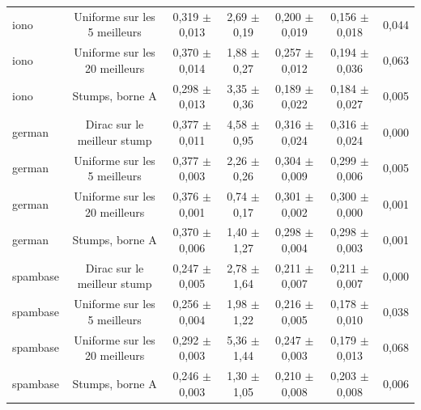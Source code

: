\begin{table}[tbp]
{\begin{tabular}{lcccccc}
iono & Uniforme sur les 5 meilleurs & 0,319 $\pm$ 0,013 & 2,69 $\pm$ 0,19 & 0,200 $\pm$ 0,019 & 0,156 $\pm$ 0,018 & 0,044 \\
iono & Uniforme sur les 20 meilleurs & 0,370 $\pm$ 0,014 & 1,88 $\pm$ 0,27 & 0,257 $\pm$ 0,012 & 0,194 $\pm$ 0,036 & 0,063 \\
iono & Stumps, borne A & 0,298 $\pm$ 0,013 & 3,35 $\pm$ 0,36 & 0,189 $\pm$ 0,022 & 0,184 $\pm$ 0,027 & 0,005 \\
german & Dirac sur le meilleur stump & 0,377 $\pm$ 0,011 & 4,58 $\pm$ 0,95 & 0,316 $\pm$ 0,024 & 0,316 $\pm$ 0,024 & 0,000 \\
german & Uniforme sur les 5 meilleurs & 0,377 $\pm$ 0,003 & 2,26 $\pm$ 0,26 & 0,304 $\pm$ 0,009 & 0,299 $\pm$ 0,006 & 0,005 \\
german & Uniforme sur les 20 meilleurs & 0,376 $\pm$ 0,001 & 0,74 $\pm$ 0,17 & 0,301 $\pm$ 0,002 & 0,300 $\pm$ 0,000 & 0,001 \\
german & Stumps, borne A & 0,370 $\pm$ 0,006 & 1,40 $\pm$ 1,27 & 0,298 $\pm$ 0,004 & 0,298 $\pm$ 0,003 & 0,001 \\
spambase & Dirac sur le meilleur stump & 0,247 $\pm$ 0,005 & 2,78 $\pm$ 1,64 & 0,211 $\pm$ 0,007 & 0,211 $\pm$ 0,007 & 0,000 \\
spambase & Uniforme sur les 5 meilleurs & 0,256 $\pm$ 0,004 & 1,98 $\pm$ 1,22 & 0,216 $\pm$ 0,005 & 0,178 $\pm$ 0,010 & 0,038 \\
spambase & Uniforme sur les 20 meilleurs & 0,292 $\pm$ 0,003 & 5,36 $\pm$ 1,44 & 0,247 $\pm$ 0,003 & 0,179 $\pm$ 0,013 & 0,068 \\
spambase & Stumps, borne A & 0,246 $\pm$ 0,003 & 1,30 $\pm$ 1,05 & 0,210 $\pm$ 0,008 & 0,203 $\pm$ 0,008 & 0,006 \\
\bottomrule
\end{tabular}
}
\end{table}
